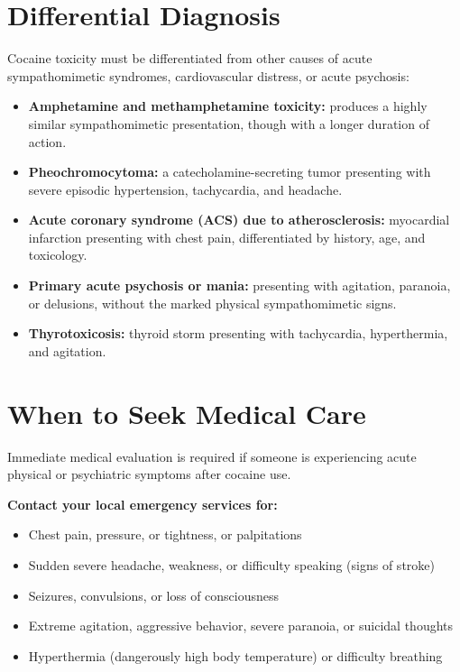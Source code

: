 \section*{Differential Diagnosis}
Cocaine toxicity must be differentiated from other causes of acute sympathomimetic syndromes, cardiovascular distress, or acute psychosis:

\begin{itemize}
    \item \textbf{Amphetamine and methamphetamine toxicity:} produces a highly similar sympathomimetic presentation, though with a longer duration of action.
    \item \textbf{Pheochromocytoma:} a catecholamine-secreting tumor presenting with severe episodic hypertension, tachycardia, and headache.
    \item \textbf{Acute coronary syndrome (ACS) due to atherosclerosis:} myocardial infarction presenting with chest pain, differentiated by history, age, and toxicology.
    \item \textbf{Primary acute psychosis or mania:} presenting with agitation, paranoia, or delusions, without the marked physical sympathomimetic signs.
    \item \textbf{Thyrotoxicosis:} thyroid storm presenting with tachycardia, hyperthermia, and agitation.
\end{itemize}

\section*{When to Seek Medical Care}
Immediate medical evaluation is required if someone is experiencing acute physical or psychiatric symptoms after cocaine use.

\textbf{Contact your local emergency services for:}
\begin{itemize}
    \item Chest pain, pressure, or tightness, or palpitations
    \item Sudden severe headache, weakness, or difficulty speaking (signs of stroke)
    \item Seizures, convulsions, or loss of consciousness
    \item Extreme agitation, aggressive behavior, severe paranoia, or suicidal thoughts
    \item Hyperthermia (dangerously high body temperature) or difficulty breathing
\end{itemize}

